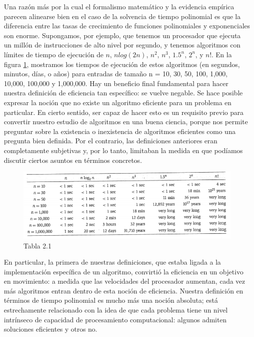 \documentclass[a4paper]{article}
\begin{document}
Una razón más por la cual el formalismo matemático y la evidencia empírica parecen alinearse bien en el caso de la solvencia de tiempo polinomial es que la diferencia  entre las tasas de crecimiento de funciones polinomiales y exponenciales son enorme.
Supongamos, por ejemplo, que tenemos un procesador que ejecuta un millón de instrucciones de alto nivel por segundo, y tenemos algoritmos con límites de tiempo de ejecución de $n$, $nlog(2n)$, $n^2$, $n^3$, $1.5^n$, $2^n$, y $n!$. En la figura \ref{Tabla 2.1}, mostramos los tiempos de ejecución de estos algoritmos (en segundos, minutos, días, o años) para entradas de tamaño n = 10, 30, 50, 100, 1,000, 10,000, 100,000 y 1,000,000. Hay un beneficio final fundamental para hacer nuestra definición de eficiencia tan específico: se vuelve negable. Se hace posible expresar la noción que no existe un algoritmo eficiente para un problema en particular. En cierto sentido, ser capaz de hacer esto es un requisito previo para convertir nuestro estudio de algoritmos en una buena ciencia, porque nos permite preguntar sobre la existencia o inexistencia de algoritmos eficientes como una pregunta bien definida. Por el contrario, las definiciones anteriores eran completamente subjetivas y, por lo tanto, limitaban la medida en que podíamos discutir ciertos asuntos en términos concretos. \\

\begin{figure}[h] 
  \centering
\includegraphics[width=1\textwidth]{Imagenes-Seccion1/Figura1.PNG}
  \caption{Tabla 2.1}
  \label{Tabla 2.1}
\end{figure}

En particular, la primera de nuestras definiciones, que estaba ligada a la implementación específica de un algoritmo, convirtió la eficiencia en un objetivo en movimiento: a medida que las velocidades del procesador aumentan, cada vez más algoritmos entran dentro de esta noción de eficiencia. Nuestra definición en términos de tiempo polinomial es mucho más una noción absoluta; está estrechamente relacionado con la idea de que cada problema tiene un nivel intrínseco de capacidad de procesamiento computacional: algunos admiten soluciones eficientes y otros no.\\
\end{document}
